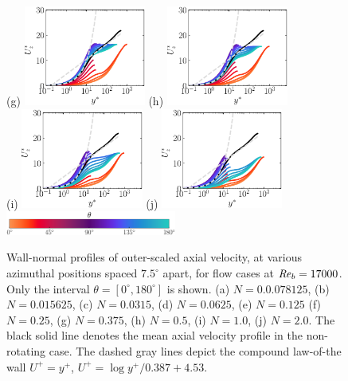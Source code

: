 \documentclass[lineno]{jfm}
\begin{document}
\begin{figure}
                (g) \includegraphics[width=4cm]{Figures/prof_uzstar_rotz0_roty0.1875.eps}
                (h) \includegraphics[width=4cm]{Figures/prof_uzstar_rotz0_roty0.25.eps} \\
                (i) \includegraphics[width=4cm]{Figures/prof_uzstar_rotz0_roty0.5.eps}
                (j) \includegraphics[width=4cm]{Figures/prof_uzstar_rotz0_roty1.0.eps} \\
                \includegraphics[width=0.5\textwidth]{Figures/theta_cmap.eps}
        \caption{
                Wall-normal profiles of
                outer-scaled axial velocity,
                at various azimuthal positions spaced
                $7.5^\circ$ apart,
                for flow cases at $\mbox{\textit{Re}}_b=17000$.
                Only the interval $\theta = [0^{\circ},180^{\circ}]$ is shown.
                (a) $N = 0.0.078125$,
                (b) $N = 0.015625$,
                (c) $N = 0.0315$,
                (d) $N = 0.0625$,
                (e) $N = 0.125$
                (f) $N = 0.25$,
                (g) $N = 0.375$,
                (h) $N = 0.5$,
                (i) $N = 1.0$,
                (j) $N = 2.0$.
                The black solid line denotes the mean axial velocity profile in the
                non-rotating case.
                The dashed gray lines depict the compound law-of-the wall
                $U^+=y^+$, $U^+=\log y^+/0.387 + 4.53$.
        }
                \label{fig:ustar}
        \end{figure}
\end{document}

